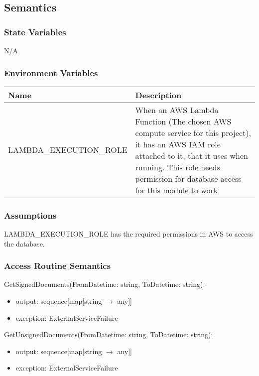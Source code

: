 \documentclass[12pt, titlepage]{article}
\begin{document}
\subsection{Semantics}

\subsubsection{State Variables}

N/A
\subsubsection{Environment Variables}
\begin{center}
  \begin{tabular}{p{6cm} p{10cm}}
    \hline
    \textbf{Name} & \textbf{Description} \\
    \hline
    LAMBDA\_EXECUTION\_ROLE & When an AWS Lambda Function (The chosen
    AWS compute service for this project), it has an AWS IAM role
    attached to it, that it uses when running. This role needs
    permission for database access for this module to work \\
    \hline
  \end{tabular}
\end{center}

\subsubsection{Assumptions}

LAMBDA\_EXECUTION\_ROLE has the required permissions in AWS to access
the database.

\subsubsection{Access Routine Semantics}
\noindent GetSignedDocuments(FromDatetime: string, ToDatetime: string):
\begin{itemize}
  \item output: sequence[map[string $\rightarrow$ any]]
  \item exception: ExternalServiceFailure
\end{itemize}

\noindent GetUnsignedDocuments(FromDatetime: string, ToDatetime: string):
\begin{itemize}
  \item output: sequence[map[string $\rightarrow$ any]]
  \item exception: ExternalServiceFailure
\end{itemize}
\end{document}
